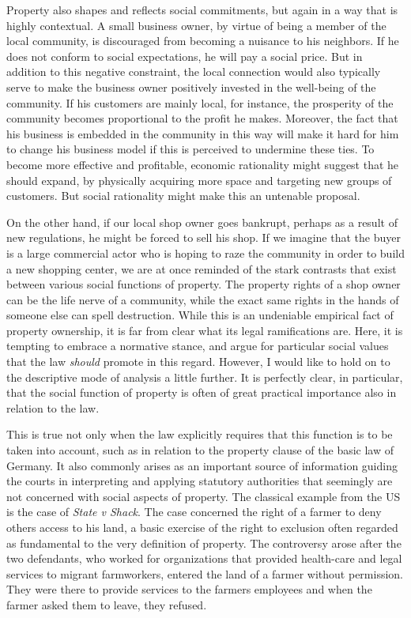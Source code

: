 Property also shapes and reflects social commitments, but again in a way that is highly contextual. A small business owner, by virtue of being a member of the local community, is discouraged from becoming a nuisance to his neighbors. If he does not conform to social expectations, he will pay a social price. But in addition to this negative constraint, the local connection would also typically serve to make the business owner positively invested in the well-being of the community. If his customers are mainly local, for instance, the prosperity of the community becomes proportional to the profit he makes. Moreover, the fact that his business is embedded in the community in this way will make it hard for him to change his business model if this is perceived to undermine these ties. To become more effective and profitable, economic rationality might suggest that he should expand, by physically acquiring more space and targeting new groups of customers. But social rationality might make this an untenable proposal.

On the other hand, if our local shop owner goes bankrupt, perhaps as a result of new regulations, he might be forced to sell his shop. If we imagine that the buyer is a large commercial actor who is hoping to raze the community in order to build a new shopping center, we are at once reminded of the stark contrasts that exist between various social functions of property. The property rights of a shop owner can be the life nerve of a community, while the exact same rights in the hands of someone else can spell destruction. While this is an undeniable empirical fact of property ownership, it is far from clear what its legal ramifications are. Here, it is tempting to embrace a normative stance, and argue for particular social values that the law {\it should} promote in this regard. However, I would like to hold on to the descriptive mode of analysis a little further. It is perfectly clear, in particular, that the social function of property is often of great practical importance also in relation to the law. 

This is true not only when the law explicitly requires that this function is to be taken into account, such as in relation to the property clause of the basic law of Germany. It also commonly arises as an important source of information guiding the courts in interpreting and applying statutory authorities that seemingly are not concerned with social aspects of property. The classical example from the US is the case of {\it State v Shack}. The case concerned the right of a farmer to deny others access to his land, a basic exercise of the right to exclusion often regarded as fundamental to the very definition of property. The controversy arose after the two defendants, who worked for organizations that provided health-care and legal services to migrant farmworkers, entered the land of a farmer without permission. They were there to provide services to the farmers employees and when the farmer asked them to leave, they refused. 

